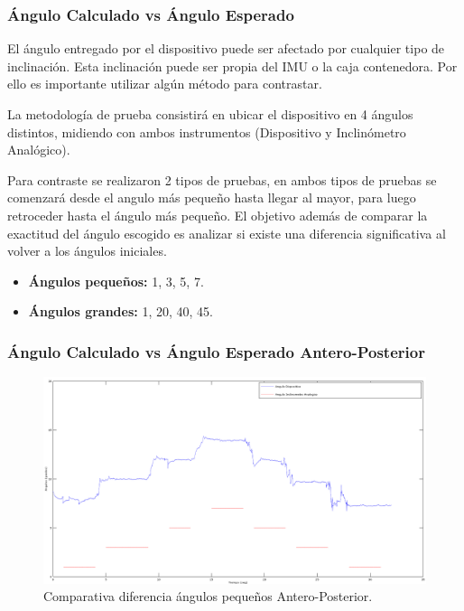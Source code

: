 \documentclass[12pt,a4paper]{article}
\begin{document}
\newpage
\subsubsection{Ángulo Calculado vs Ángulo Esperado}
El ángulo entregado por el dispositivo puede ser afectado por cualquier tipo de inclinación. Esta inclinación puede ser propia del IMU o la caja contenedora.  Por ello es importante utilizar algún método para contrastar.


La metodología de prueba consistirá en ubicar el dispositivo en 4 ángulos distintos, midiendo con ambos instrumentos (Dispositivo y Inclinómetro Analógico).


Para contraste se realizaron 2 tipos de pruebas, en ambos tipos de pruebas se comenzará desde el angulo más pequeño hasta llegar al mayor, para luego retroceder hasta el ángulo más pequeño. El objetivo además de comparar la exactitud del ángulo escogido es analizar si existe una diferencia significativa al volver a los ángulos iniciales.

\begin{itemize}
	\item \textbf{Ángulos pequeños: }1, 3, 5, 7.
	\item \textbf{Ángulos grandes: }1, 20, 40, 45.
\end{itemize}



\subsubsection{Ángulo Calculado vs Ángulo Esperado Antero-Posterior}

\begin{figure}[H]
	\centering
	\includegraphics[scale=0.4]{images/pruebas/Inclinometro/AnteroPosteriorB}
	\caption{Comparativa diferencia ángulos pequeños Antero-Posterior.}
	\label{fig:inclinometroVsDispositivoAP}
\end{figure}
\end{document}
